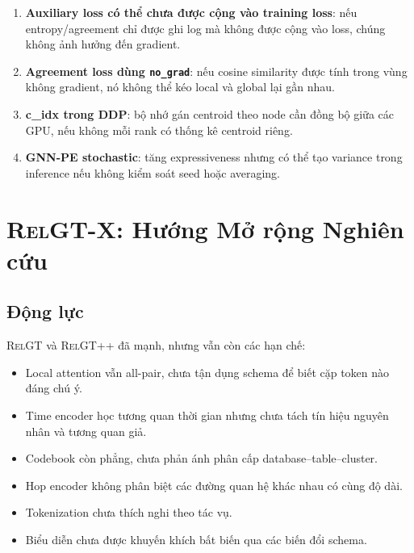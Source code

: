 \documentclass[12pt,a4paper]{article}
\newcommand{\RelGT}{\textsc{RelGT}}
\newcommand{\RelGTpp}{\textsc{RelGT++}}
\newcommand{\RelGTx}{\textsc{RelGT-X}}
\begin{document}
\begin{warnbox}
\begin{enumerate}
  \item \textbf{Auxiliary loss có thể chưa được cộng vào training loss}: nếu
        entropy/agreement chỉ được ghi log mà không được cộng vào loss, chúng
        không ảnh hưởng đến gradient.
  \item \textbf{Agreement loss dùng \texttt{no\_grad}}: nếu cosine similarity
        được tính trong vùng không gradient, nó không thể kéo local và global
        lại gần nhau.
  \item \textbf{c\_idx trong DDP}: bộ nhớ gán centroid theo node cần đồng bộ
        giữa các GPU, nếu không mỗi rank có thống kê centroid riêng.
  \item \textbf{GNN-PE stochastic}: tăng expressiveness nhưng có thể tạo variance
        trong inference nếu không kiểm soát seed hoặc averaging.
\end{enumerate}
\end{warnbox}

\section{\RelGTx{}: Hướng Mở rộng Nghiên cứu}

\subsection{Động lực}

\RelGT{} và \RelGTpp{} đã mạnh, nhưng vẫn còn các hạn chế:
\begin{itemize}
  \item Local attention vẫn all-pair, chưa tận dụng schema để biết cặp token
        nào đáng chú ý.
  \item Time encoder học tương quan thời gian nhưng chưa tách tín hiệu nguyên
        nhân và tương quan giả.
  \item Codebook còn phẳng, chưa phản ánh phân cấp database--table--cluster.
  \item Hop encoder không phân biệt các đường quan hệ khác nhau có cùng độ dài.
  \item Tokenization chưa thích nghi theo tác vụ.
  \item Biểu diễn chưa được khuyến khích bất biến qua các biến đổi schema.
\end{itemize}
\end{document}
